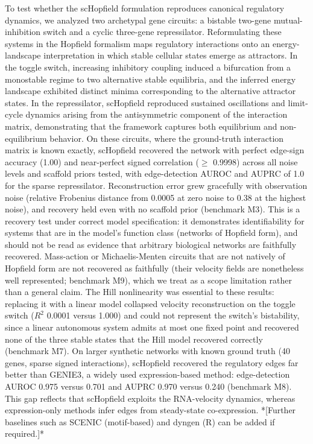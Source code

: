 \documentclass[11pt]{article}
\begin{document}
To test whether the scHopfield formulation reproduces canonical regulatory dynamics, we analyzed two archetypal gene circuits: a bistable two-gene mutual-inhibition switch and a cyclic three-gene repressilator. Reformulating these systems in the Hopfield formalism maps regulatory interactions onto an energy-landscape interpretation in which stable cellular states emerge as attractors. In the toggle switch, increasing inhibitory coupling induced a bifurcation from a monostable regime to two alternative stable equilibria, and the inferred energy landscape exhibited distinct minima corresponding to the alternative attractor states. In the repressilator, scHopfield reproduced sustained oscillations and limit-cycle dynamics arising from the antisymmetric component of the interaction matrix, demonstrating that the framework captures both equilibrium and non-equilibrium behavior.  On these circuits, where the ground-truth interaction matrix is known exactly, scHopfield recovered the network with perfect edge-sign accuracy (1.00) and near-perfect signed correlation ($\geq$ 0.9998) across all noise levels and scaffold priors tested, with edge-detection AUROC and AUPRC of 1.0 for the sparse repressilator. Reconstruction error grew gracefully with observation noise (relative Frobenius distance from 0.0005 at zero noise to 0.38 at the highest noise), and recovery held even with no scaffold prior (benchmark M3). This is a recovery test under correct model specification: it demonstrates identifiability for systems that are in the model's function class (networks of Hopfield form), and should not be read as evidence that arbitrary biological networks are faithfully recovered. Mass-action or Michaelis-Menten circuits that are not natively of Hopfield form are not recovered as faithfully (their velocity fields are nonetheless well represented; benchmark M9), which we treat as a scope limitation rather than a general claim. The Hill nonlinearity was essential to these results: replacing it with a linear model collapsed velocity reconstruction on the toggle switch ($R^2$ 0.0001 versus 1.000) and could not represent the switch's bistability, since a linear autonomous system admits at most one fixed point and recovered none of the three stable states that the Hill model recovered correctly (benchmark M7). On larger synthetic networks with known ground truth (40 genes, sparse signed interactions), scHopfield recovered the regulatory edges far better than GENIE3, a widely used expression-based method: edge-detection AUROC 0.975 versus 0.701 and AUPRC 0.970 versus 0.240 (benchmark M8). This gap reflects that scHopfield exploits the RNA-velocity dynamics, whereas expression-only methods infer edges from steady-state co-expression. *[Further baselines such as SCENIC (motif-based) and dyngen (R) can be added if required.]*
\end{document}
